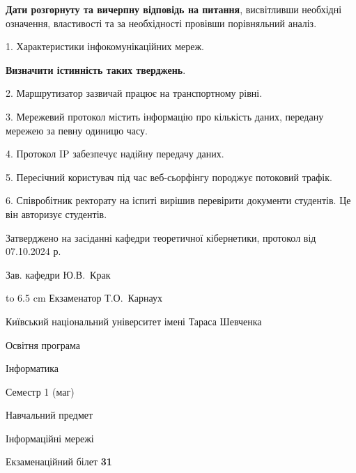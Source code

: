 \documentclass[12pt, ukrainian]{article}
\begin{document}
{
\qquad\textbf{Дати розгорнуту та вичерпну відповідь на питання}, висвітливши необхідні означення, властивості та за необхідності провівши порівняльний аналіз.

1. Характеристики інфокомунікаційних мереж.



\qquad\textbf{Визначити істинність таких тверджень}.

2. Маршрутизатор зазвичай працює на транспортному рівні.


3. Мережевий протокол містить інформацію про кількість даних, передану мережею за певну одиницю часу.


4. Протокол IP забезпечує надійну передачу даних.


5. Пересічний користувач під час веб-сьорфінгу породжує потоковий трафік.


6. Співробітник ректорату на іспиті вирішив перевірити документи студентів. Це він авторизує студентів.

}
{\smallskip\smallskip \begin {scriptsize} Затверджено на засіданні кафедри теоретичної кібернетики, протокол   від   07.10.2024 р.\par\smallskip\smallskip\smallskip\smallskip
{\parbox {6.5 cm} {Зав. кафедри \dotfill Ю.В.~Крак}}\hspace {0.7cm} {\hbox to 6.5 cm { Екзаменатор \dotfill Т.О.~Карнаух}} \end{scriptsize}}
\newpage
{{\begin {scriptsize}\par
{ \center  Київський національний університет імені Тараса Шевченка \par}
{\parbox {5 cm}{Освітня програма \hfill}{\parbox {7 cm}{Інформатика\hfill}}\parbox {6 cm}{\hfill Семестр 1 (маг)}}\par
{\parbox {5 cm} {Навчальний предмет \hfill}\parbox {7 cm}{Інформаційні мережі \hfill}\parbox {6cm}{\hfill}\par}\vspace{-15pt} \end{scriptsize}}{\center Екзаменаційний білет \No \textbf { 31 }\par}}
\end{document}
